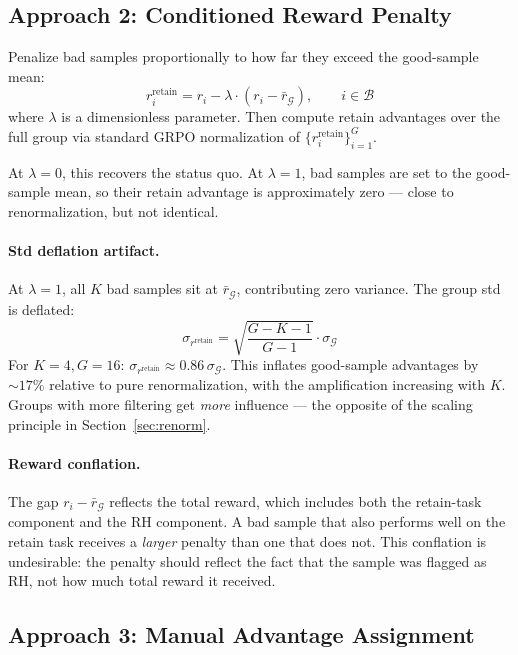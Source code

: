 \documentclass[11pt]{article}
\begin{document}
\subsection{Approach 2: Conditioned Reward Penalty}

Penalize bad samples proportionally to how far they exceed the good-sample mean:
\begin{equation}
    r_i^{\text{retain}} = r_i - \lambda \cdot (r_i - \bar{r}_{\mathcal{G}}),
    \qquad i \in \mathcal{B}
\end{equation}
where $\lambda$ is a dimensionless parameter. Then compute retain advantages
over the full group via standard GRPO normalization of
$\{r_i^{\text{retain}}\}_{i=1}^{G}$.

At $\lambda = 0$, this recovers the status quo.  At $\lambda = 1$, bad samples
are set to the good-sample mean, so their retain advantage is approximately zero
--- close to renormalization, but not identical.

\paragraph{Std deflation artifact.}
At $\lambda = 1$, all $K$ bad samples sit at $\bar{r}_{\mathcal{G}}$,
contributing zero variance. The group std is deflated:
\begin{equation}
    \sigma_{r^{\text{retain}}} = \sqrt{\frac{G - K - 1}{G - 1}}
        \cdot \sigma_{\mathcal{G}}
\end{equation}
For $K = 4, G = 16$: $\sigma_{r^{\text{retain}}} \approx 0.86\,
\sigma_{\mathcal{G}}$. This inflates good-sample advantages by ${\sim}17\%$
relative to pure renormalization, with the amplification increasing with $K$.
Groups with more filtering get \emph{more} influence --- the opposite of the
scaling principle in Section~\ref{sec:renorm}.

\paragraph{Reward conflation.}
The gap $r_i - \bar{r}_{\mathcal{G}}$ reflects the total reward, which includes
both the retain-task component and the RH component. A bad sample that also
performs well on the retain task receives a \emph{larger} penalty than one that
does not. This conflation is undesirable: the penalty should reflect the fact
that the sample was flagged as RH, not how much total reward it received.

\subsection{Approach 3: Manual Advantage Assignment}
\end{document}
